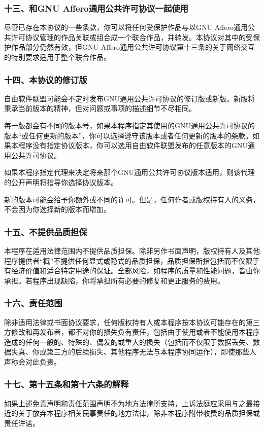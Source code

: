 \subsubsection{十三、和GNU Affero通用公共许可协议一起使用}
尽管已存在本协议的一些条款，你可以将任何受保护作品与以GNU Affero通用公共许可协议管理的作品关联或组合成一个联合作品，并转发。本协议对其中的受保护作品部分仍然有效，但GNU Affero通用公共许可协议第十三条的关于网络交互的特别要求适用于整个联合作品。
\subsubsection{十四、本协议的修订版}
自由软件联盟可能会不定时发布GNU通用公共许可协议的修订版或新版。新版将秉承当前版本的精神，但对问题或事项的描述细节不尽相同。\par
每一版都会有不同的版本号，如果本程序指定其使用的GNU通用公共许可协议的版本“或任何更新的版本”，你可以选择遵守该版本或者任何更新的版本的条款。如果本程序没有指定协议版本，你可以选用自由软件联盟发布的任意版本的GNU通用公共许可协议。\par
如果本程序指定代理来决定将来那个GNU通用公共许可协议版本适用，则该代理的公开声明将指导你选择协议版本。\par
新的版本可能会给予你额外或不同的许可。但是，任何作者或版权持有人的义务，不会因为你选择新的版本而增加。\par
\subsubsection{十五、不提供品质担保}
本程序在适用法律范围内不提供品质担保。除非另作书面声明，版权持有人及其他程序提供者“概”不提供任何显式或隐式的品质担保，品质担保所指包括而不仅限于有经济价值和适合特定用途的保证。全部风险，如程序的质量和性能问题，皆由你承担。若程序出现缺陷，你将承担所有必要的修复和更正服务的费用。
\subsubsection{十六、责任范围}
除非适用法律或书面协议要求，任何版权持有人或本程序按本协议可能存在的第三方修改和再发布者，都不对你的损失负有责任，包括由于使用或者不能使用本程序造成的任何一般的、特殊的、偶发的或重大的损失（包括而不仅限于数据丢失、数据失真、你或第三方的后续损失、其他程序无法与本程序协同运作），即使那些人声称会对此负责。
\subsubsection{十七、第十五条和第十六条的解释}
如果上述免责声明和责任范围声明不为地方法律所支持，上诉法庭应采用与之最接近的关于放弃本程序相关民事责任的地方法律，除非本程序附带收费的品质担保或责任许诺。
